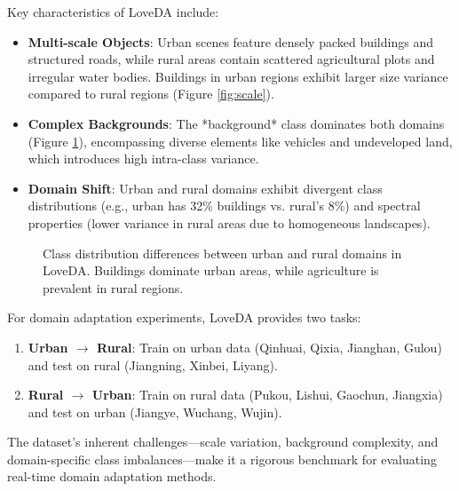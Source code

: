 \documentclass{article}
\begin{document}
\begin{multicols}{2}
		Key characteristics of LoveDA include:  
		\begin{itemize}  
			\item \textbf{Multi-scale Objects}: Urban scenes feature densely packed buildings and structured roads, while rural areas contain scattered agricultural plots and irregular water bodies. Buildings in urban regions exhibit larger size variance compared to rural regions (Figure \ref{fig:scale}).  
			\item \textbf{Complex Backgrounds}: The *background* class dominates both domains (Figure \ref{fig:class_dist}), encompassing diverse elements like vehicles and undeveloped land, which introduces high intra-class variance.  
			\item \textbf{Domain Shift}: Urban and rural domains exhibit divergent class distributions (e.g., urban has 32\% buildings vs. rural’s 8\%) and spectral properties (lower variance in rural areas due to homogeneous landscapes).  
		\end{itemize}  
		
		\begin{figure}[ht]  
			\begin{center}

			\caption{Class distribution differences between urban and rural domains in LoveDA. Buildings dominate urban areas, while agriculture is prevalent in rural regions.}  
			\label{fig:class_dist} 
			\end{center} 

		\end{figure}  
		
		For domain adaptation experiments, LoveDA provides two tasks:  
		\begin{enumerate}  
			\item \textbf{Urban $\rightarrow$ Rural}: Train on urban data (Qinhuai, Qixia, Jianghan, Gulou) and test on rural (Jiangning, Xinbei, Liyang).  
			\item \textbf{Rural $\rightarrow$ Urban}: Train on rural data (Pukou, Lishui, Gaochun, Jiangxia) and test on urban (Jiangye, Wuchang, Wujin).  
		\end{enumerate}  
		
		The dataset’s inherent challenges—scale variation, background complexity, and domain-specific class imbalances—make it a rigorous benchmark for evaluating real-time domain adaptation methods.  
		
		\begin{figure}[ht]  
			\begin{center} 


\end{center}
\end{figure}
\end{multicols}
\end{document}
